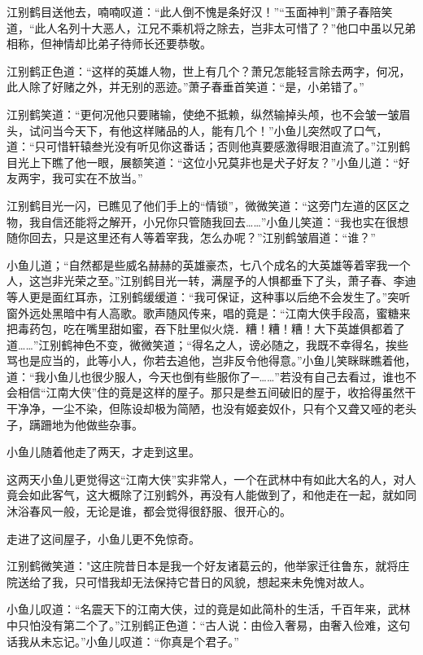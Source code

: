\documentclass[12pt,oneside]{book}
\begin{document}
江别鹤目送他去，喃喃叹道：``此人倒不愧是条好汉！''``玉面神判''萧子春陪笑道，``此人名列十大恶人，江兄不乘机将之除去，岂非太可惜了？''他口中虽以兄弟相称，但神情却比弟子待师长还要恭敬。

江别鹤正色道：``这样的英雄人物，世上有几个？萧兄怎能轻言除去两字，何况，此人除了好赌之外，并无别的恶迹。''萧子春垂首笑道：``是，小弟错了。''

江别鹤笑道：``更何况他只要赌输，使绝不抵赖，纵然输掉头颅，也不会皱一皱眉头，试问当今天下，有他这样赌品的人，能有几个！''小鱼儿突然叹了口气，道：``只可惜轩辕叁光没有听见你这番话；否则他真要感激得眼泪直流了。''江别鹤目光上下瞧了他一眼，展额笑道：``这位小兄莫非也是犬子好友？''小鱼儿道：``好友两宇，我可实在不放当。''

江别鹤目光一闪，已瞧见了他们手上的``情锁''，微微笑道：``这旁门左道的区区之物，我自信还能将之解开，小兄你只管随我回去\ldots\ldots{}''小鱼儿笑道：``我也实在很想随你回去，只是这里还有人等着宰我，怎么办呢？''江别鹤皱眉道：``谁？''

小鱼儿道；``自然都是些威名赫赫的英雄豪杰，七八个成名的大英雄等着宰我一个人，这岂非光荣之至。''江别鹤目光一转，满屋予的人惧都垂下了头，萧子春、李迪等人更是面红耳赤，江别鹤缓缓道：``我可保证，这种事以后绝不会发生了。''突听窗外远处黑暗中有人高歌。歌声随风传来，唱的竟是：``江南大侠手段高，蜜糖来把毒药包，吃在嘴里甜如蜜，吞下肚里似火烧．糟！糟！糟！大下英雄俱都着了道\ldots\ldots{}''江别鹤神色不变，微微笑道；``得名之人，谤必随之，我既不幸得名，挨些骂也是应当的，此等小人，你若去追他，岂非反令他得意。''小鱼儿笑眯眯瞧着他，道：``我小鱼儿也很少服人，今天也倒有些服你了─\ldots\ldots{}''若没有自己去看过，谁也不会相信``江南大侠''住的竟是这样的屋子。那只是叁五间破旧的屋于，收拾得虽然干干净净，一尘不染，但陈设却极为简陋，也没有姬妾奴仆，只有个又聋又哑的老头子，蹒跚地为他做些杂事。

小鱼儿随着他走了两天，才走到这里。

这两天小鱼儿更觉得这``江南大侠''实非常人，一个在武林中有如此大名的人，对人竟会如此客气，这大概除了江别鹤外，再没有人能做到了，和他走在一起，就如同沐浴春风一般，无论是谁，都会觉得很舒服、很开心的。

走进了这间屋子，小鱼儿更不免惊奇。

江别鹤微笑道："这庄院昔日本是我一个好友诸葛云的，他举家迁往鲁东，就将庄院送给了我，只可惜我却无法保持它昔日的风貌，想起来未免愧对故人。

小鱼儿叹道：``名震天下的江南大侠，过的竟是如此简朴的生活，千百年来，武林中只怕没有第二个了。''江别鹤正色道：``古人说：由俭入奢易，由奢入俭难，这句话我从未忘记。''小鱼儿叹道：``你真是个君子。''
\end{document}
